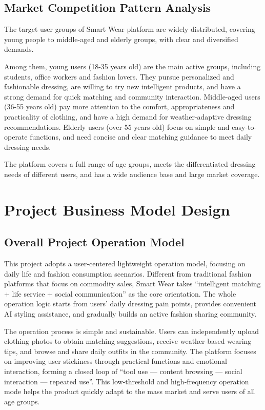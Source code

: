 \documentclass[12pt,a4paper]{article}
\begin{document}
\subsection{Market Competition Pattern Analysis}
The target user groups of Smart Wear platform are widely distributed, covering young people to middle-aged and elderly groups, with clear and diversified demands.

Among them, young users (18-35 years old) are the main active groups, including students, office workers and fashion lovers. They pursue personalized and fashionable dressing, are willing to try new intelligent products, and have a strong demand for quick matching and community interaction. Middle-aged users (36-55 years old) pay more attention to the comfort, appropriateness and practicality of clothing, and have a high demand for weather-adaptive dressing recommendations. Elderly users (over 55 years old) focus on simple and easy-to-operate functions, and need concise and clear matching guidance to meet daily dressing needs.

The platform covers a full range of age groups, meets the differentiated dressing needs of different users, and has a wide audience base and large market coverage.


\section{Project Business Model Design}
\subsection{Overall Project Operation Model}
This project adopts a user‑centered lightweight operation model, focusing on daily life and fashion consumption scenarios. Different from traditional fashion platforms that focus on commodity sales, Smart Wear takes “intelligent matching + life service + social communication” as the core orientation. The whole operation logic starts from users’ daily dressing pain points, provides convenient AI styling assistance, and gradually builds an active fashion sharing community.

The operation process is simple and sustainable. Users can independently upload clothing photos to obtain matching suggestions, receive weather‑based wearing tips, and browse and share daily outfits in the community. The platform focuses on improving user stickiness through practical functions and emotional interaction, forming a closed loop of “tool use — content browsing — social interaction — repeated use”. This low‑threshold and high‑frequency operation mode helps the product quickly adapt to the mass market and serve users of all age groups.
\end{document}
